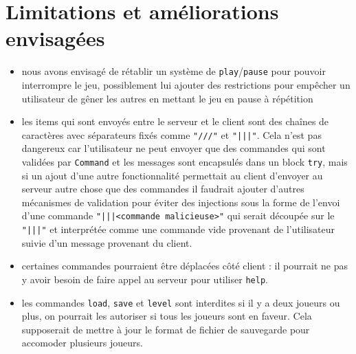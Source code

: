 \documentclass[a4paper,french]{article}
\newcommand{\ttt}[1]{\texttt{#1}}
\begin{document}
\section{Limitations et améliorations envisagées}

\begin{itemize}
    \item nous avons envisagé de rétablir un système de \ttt{play}/\ttt{pause} pour pouvoir interrompre le jeu,
        possiblement lui ajouter des restrictions pour empêcher un utilisateur de gêner les autres en mettant le
        jeu en pause à répétition
    \item les items qui sont envoyés entre le serveur et le client sont des cha\^ines de caractères avec séparateurs
        fixés comme \ttt{"///"} et \ttt{"|||"}. Cela n'est pas dangereux car l'utilisateur ne peut envoyer
        que des commandes qui sont validées par \ttt{Command} et les messages sont encapsulés dans un block \ttt{try},
        mais si un ajout d'une autre fonctionnalité permettait au client d'envoyer au serveur autre chose que des commandes
        il faudrait ajouter d'autres mécanismes de validation pour éviter des injections sous la forme de l'envoi
        d'une commande \ttt{"|||<commande malicieuse>"} qui serait découpée sur le \ttt{"|||"} et interprétée
        comme une commande vide provenant de l'utilisateur suivie d'un message provenant du client.
    \item certaines commandes pourraient être déplacées côté client : il pourrait ne pas y avoir besoin de faire
        appel au serveur pour utiliser \ttt{help}.
    \item les commandes \ttt{load}, \ttt{save} et \ttt{level} sont interdites si il y a deux joueurs ou plus, on pourrait les
        autoriser si tous les joueurs sont en faveur. Cela supposerait de mettre à jour le format de fichier de sauvegarde
        pour accomoder plusieurs joueurs.
\end{itemize}
\end{document}
